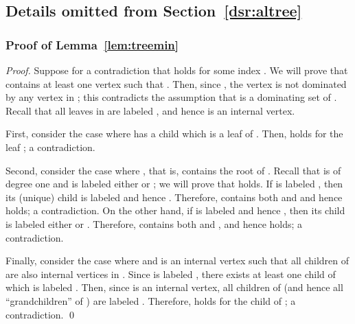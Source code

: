 \documentclass{llncs}
\begin{document}
\subsection{Details omitted from Section~\ref{dsr:altree}}
\subsubsection{Proof of Lemma~\ref{lem:treemin}}
\begin{proof}
Suppose for a contradiction that  holds for some index .
We will prove that  contains at least one vertex  such that .
Then, since , the vertex  is not dominated by any vertex in ;
this contradicts the assumption that  is a dominating set of .
Recall that all leaves in  are labeled , and hence  is an internal vertex.
	
First, consider the case where  has a child  which is a leaf of .
Then,  holds for the leaf ; a contradiction.

Second, consider the case where , that is,   contains the root  of .
Recall that  is of degree one and is labeled either  or ;
we will prove that  holds.
If  is labeled , then its (unique) child  is labeled  and hence .
Therefore,  contains both  and  and hence  holds; a contradiction.
On the other hand, if  is labeled  and hence , then its child  is labeled either  or .
Therefore,  contains both  and , and hence  holds; a contradiction.

Finally, consider the case where  and  is an
internal vertex such that all children of  are also internal vertices in .
Since  is labeled , there exists at least one child  of  which is labeled .
Then, since  is an internal vertex, all children of  (and hence all ``grandchildren'' of ) are labeled .
Therefore,  holds for the child  of ; a contradiction.
\qed
\end{proof}
\end{document}
